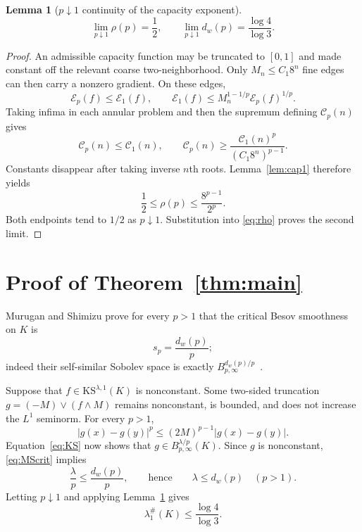 \documentclass[10pt]{article}
\newtheorem{lemma}[theorem]{Lemma}
\newcommand{\KS}{\mathrm{KS}}
\begin{document}
\begin{lemma}[$p\downarrow1$ continuity of the capacity exponent]
\label{lem:continuity}
\begin{equation}\label{eq:rholimit}
 \lim_{p\downarrow1}\rho(p)=\frac12,\qquad
 \lim_{p\downarrow1}d_w(p)=\frac{\log4}{\log3}.
\end{equation}
\end{lemma}

\begin{proof}
An admissible capacity function may be truncated to $[0,1]$ and made
constant off the relevant coarse two-neighborhood.  Only $M_n\leq C_1 8^n$
fine edges can then carry a nonzero gradient.  On these edges,
\[
 \mathcal E_p(f)\leq\mathcal E_1(f),\qquad
 \mathcal E_1(f)\leq M_n^{1-1/p}\mathcal E_p(f)^{1/p}.
\]
Taking infima in each annular problem and then the supremum defining
$\mathcal C_p(n)$ gives
\begin{equation}\label{eq:capcompare}
 \mathcal C_p(n)\leq\mathcal C_1(n),\qquad
 \mathcal C_p(n)\geq
 \frac{\mathcal C_1(n)^p}{(C_1 8^n)^{p-1}}.
\end{equation}
Constants disappear after taking inverse $n$th roots.  Lemma~\ref{lem:cap1}
therefore yields
\[
 \frac12\leq\rho(p)\leq\frac{8^{p-1}}{2^p}.
\]
Both endpoints tend to $1/2$ as $p\downarrow1$.  Substitution into
\eqref{eq:rho} proves the second limit.
\end{proof}

\section{Proof of Theorem~\ref{thm:main}}

Murugan and Shimizu prove for every $p>1$ that the critical Besov
smoothness on $K$ is
\begin{equation}\label{eq:MScrit}
 s_p=\frac{d_w(p)}p;
\end{equation}
indeed their self-similar Sobolev space is exactly
$B^{d_w(p)/p}_{p,\infty}$~\cite[Theorem~1.4]{MS}.

Suppose that $f\in\KS^{\lambda,1}(K)$ is nonconstant.  Some two-sided
truncation $g=(-M)\vee(f\wedge M)$ remains nonconstant, is bounded, and does
not increase the $L^1$ seminorm.  For every $p>1$,
\[
 |g(x)-g(y)|^p\leq(2M)^{p-1}|g(x)-g(y)|.
\]
Equation~\eqref{eq:KS} now shows that
$g\in B^{\lambda/p}_{p,\infty}(K)$.  Since $g$ is nonconstant,
\eqref{eq:MScrit} implies
\[
 \frac\lambda p\leq\frac{d_w(p)}p,
 \qquad\text{hence}\qquad \lambda\leq d_w(p)\quad(p>1).
\]
Letting $p\downarrow1$ and applying Lemma~\ref{lem:continuity} gives
\begin{equation}\label{eq:upper}
 \lambda_1^\#(K)\leq\frac{\log4}{\log3}.
\end{equation}
\end{document}
